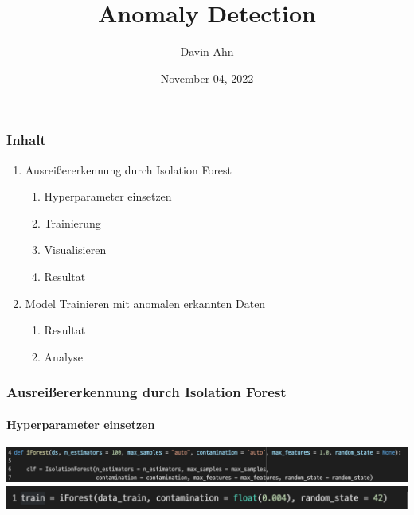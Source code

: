 \documentclass{beamer}
\title{Anomaly Detection}
\author{Davin Ahn}
\date{November 04, 2022}
\begin{document}
    \begin{frame}
        \titlepage
    \end{frame}

    \begin{frame}
        \frametitle{Inhalt}
        \begin{enumerate}
            \item Ausreißererkennung durch Isolation Forest
            \begin{enumerate}
                \item{Hyperparameter einsetzen}
                \item{Trainierung}
                \item{Visualisieren}
                \item{Resultat}
            \end{enumerate}

            \item Model Trainieren mit anomalen erkannten Daten
            \begin{enumerate}
                \item{Resultat}
                \item{Analyse}
            \end{enumerate}
        \end{enumerate}
    \end{frame}

    \begin{frame}
        \frametitle{Ausreißererkennung durch Isolation Forest}
        \framesubtitle{Hyperparameter einsetzen}
        \centering
        \includegraphics[scale=0.35]{parameter1.png}
        \includegraphics[scale=0.54]{parameter2.png}
    \end{frame}
\end{document}
